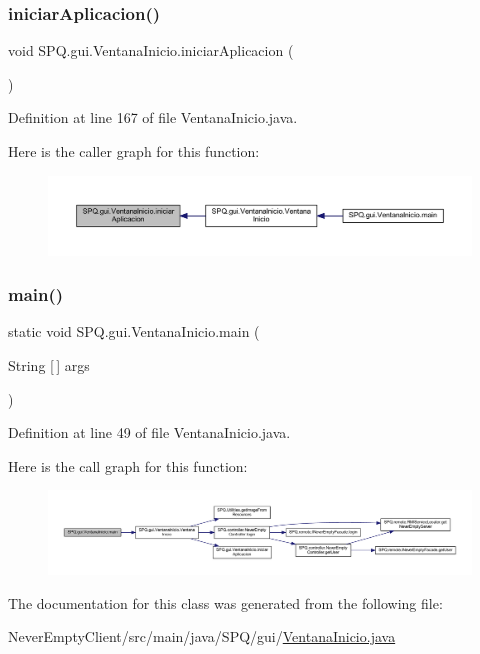 \subsubsection{\texorpdfstring{iniciar\+Aplicacion()}{iniciarAplicacion()}}
{\footnotesize\ttfamily void S\+P\+Q.\+gui.\+Ventana\+Inicio.\+iniciar\+Aplicacion (\begin{DoxyParamCaption}{ }\end{DoxyParamCaption})}



Definition at line 167 of file Ventana\+Inicio.\+java.

Here is the caller graph for this function\+:\nopagebreak
\begin{figure}[H]
\begin{center}
\leavevmode
\includegraphics[width=350pt]{class_s_p_q_1_1gui_1_1_ventana_inicio_a0588d157580852e153c5dd2291645173_icgraph}
\end{center}
\end{figure}
\mbox{\label{class_s_p_q_1_1gui_1_1_ventana_inicio_ab33d2c349f8f7475d2d6833e9bf75e76}} 
\subsubsection{\texorpdfstring{main()}{main()}}
{\footnotesize\ttfamily static void S\+P\+Q.\+gui.\+Ventana\+Inicio.\+main (\begin{DoxyParamCaption}\item[{String \mbox{[}$\,$\mbox{]}}]{args }\end{DoxyParamCaption})\hspace{0.3cm}{\ttfamily [static]}}



Definition at line 49 of file Ventana\+Inicio.\+java.

Here is the call graph for this function\+:\nopagebreak
\begin{figure}[H]
\begin{center}
\leavevmode
\includegraphics[width=350pt]{class_s_p_q_1_1gui_1_1_ventana_inicio_ab33d2c349f8f7475d2d6833e9bf75e76_cgraph}
\end{center}
\end{figure}


The documentation for this class was generated from the following file\+:\begin{DoxyCompactItemize}
\item 
Never\+Empty\+Client/src/main/java/\+S\+P\+Q/gui/\mbox{\hyperlink{_ventana_inicio_8java}{Ventana\+Inicio.\+java}}\end{DoxyCompactItemize}
